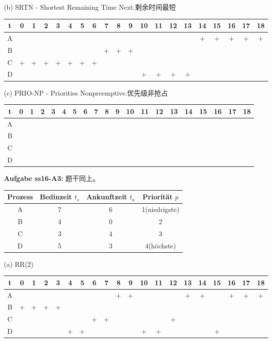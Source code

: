 \documentclass[fleqn]{article}
\begin{document}
(b) SRTN - Shortest Remaining Time Next.剩余时间最短

\begin{center}
    \begin{tabular}{|c||c|c|c|c|c|c|c|c|c|c|c|c|c|c|c|c|c|c|c|}
        \hline
        t&0&1&2&3&4&5&6&7&8&9&10&11&12&13&14&15&16&17&18\\
        \hline
        A&&&&&&&&&&&&&&&+&+&+&+&+\\
        \hline
        B&&&&&&&&+&+&+&&&&&&&&&\\
        \hline
        C&+&+&+&+&+&+&+&&&&&&&&&&&&\\
        \hline
        D&&&&&&&&&&&+&+&+&+&&&&&\\
        \hline
    \end{tabular}
\end{center}

(c) PRIO-NP - Priorities Nonpreemptive.优先级非抢占

\begin{center}
    \begin{tabular}{|c||c|c|c|c|c|c|c|c|c|c|c|c|c|c|c|c|c|c|c|}
        \hline
        t&0&1&2&3&4&5&6&7&8&9&10&11&12&13&14&15&16&17&18\\
        \hline
        A&&&&&&&&&&&&&&&&&&&\\
        \hline
        B&&&&&&&&&&&&&&&&&&&\\
        \hline
        C&&&&&&&&&&&&&&&&&&&\\
        \hline
        D&&&&&&&&&&&&&&&&&&&\\
        \hline
    \end{tabular}
\end{center}

\noindent\textbf{Aufgabe ss16-A3:}
题干同上。

\begin{center}
    \begin{tabular}{|c|c|c|c|}
        \hline
        Prozess&Bedinzeit $t_s$&Ankunftzeit $t_a$&Priorität $p$\\
        \hline
        A&7&6&1(niedrigste)\\
        B&4&0&2\\
        C&3&4&3\\
        D&5&3&4(höchste)\\
        \hline
    \end{tabular}
\end{center}

(a) RR(2)

\begin{center}
    \begin{tabular}{|c||c|c|c|c|c|c|c|c|c|c|c|c|c|c|c|c|c|c|c|}
        \hline
        t&0&1&2&3&4&5&6&7&8&9&10&11&12&13&14&15&16&17&18\\
        \hline
        A&&&&&&&&&+&+&&&&+&+&&+&+&+\\
        \hline
        B&+&+&+&+&&&&&&&&&&&&&&&\\
        \hline
        C&&&&&&&+&+&&&&&+&&&&&&\\
        \hline
        D&&&&&+&+&&&&&+&+&&&&+&&&\\
        \hline
    \end{tabular}
\end{center}
\end{document}
